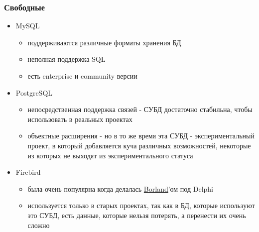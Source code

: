 \subsubsection{Свободные}
\begin{itemize}
    \item MySQL
    \begin{itemize}
        \item поддерживаются различные форматы хранения БД
        \item неполная поддержка SQL
        \item есть enterprise и community версии
    \end{itemize}
    \item PostgreSQL
    \begin{itemize}
        \item непосредственная поддержка связей - СУБД достаточно стабильна, чтобы использовать в реальных проектах
        \item объектные расширения - но в то же время эта СУБД - экспериментальный проект, в который добавляется куча различных возможностей, некоторые из которых не выходят из экспериментального статуса
    \end{itemize}
    \item Firebird
    \begin{itemize}
        \item была очень популярна когда делалась \href{https://en.wikipedia.org/wiki/Borland}{Borland}'ом под Delphi
        \item используется только в старых проектах, так как в БД, которые используют это СУБД, есть данные, которые нельзя потерять, а перенести их очень сложно
    \end{itemize}
\end{itemize}

